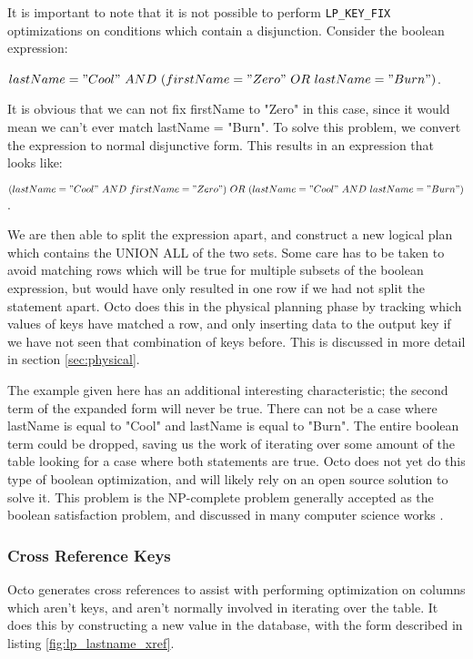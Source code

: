 \documentclass[]{article}
\def\code#1{\texttt{#1}}
\begin{document}
It is important to note that it is not possible to perform \code{LP\_KEY\_FIX} optimizations on conditions which contain a disjunction.
Consider the boolean expression:

$lastName = "Cool"\ AND\ (firstName = "Zero"\ OR\ lastName = "Burn")$.

It is obvious that we can not fix firstName to "Zero" in this case, since it would mean we can't ever match lastName = "Burn".
To solve this problem, we convert the expression to normal disjunctive form.
This results in an expression that looks like:

$(lastName = "Cool"\ AND\ firstName = "Zero")\ OR\ (lastName = "Cool"\ AND\ lastName = "Burn")$.

We are then able to split the expression apart, and construct a new logical plan which contains the UNION ALL of the two sets.
Some care has to be taken to avoid matching rows which will be true for multiple subsets of the boolean expression, but would have only resulted in one row if we had not split the statement apart.
Octo does this in the physical planning phase by tracking which values of keys have matched a row, and only inserting data to the output key if we have not seen that combination of keys before.
This is discussed in more detail in section \ref{sec:physical}.

The example given here has an additional interesting characteristic; the second term of the expanded form will never be true.
There can not be a case where lastName is equal to "Cool" and lastName is equal to "Burn".
The entire boolean term could be dropped, saving us the work of iterating over some amount of the table looking for a case where both statements are true.
Octo does not yet do this type of boolean optimization, and will likely rely on an open source solution to solve it.
This problem is the NP-complete problem generally accepted as the boolean satisfaction problem, and discussed in many computer science works \cite{cook_complexity_1971}.

\subsubsection{Cross Reference Keys} \label{sec:lp_xref_keys}

Octo generates cross references to assist with performing optimization on columns which aren't keys, and aren't normally involved in iterating over the table.
It does this by constructing a new value in the database, with the form described in listing \ref{fig:lp_lastname_xref}.
\end{document}
